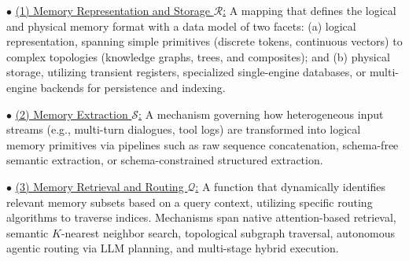 \documentclass{llmxive}
\providecommand{\llm}{\textsc{LLM}\xspace}
\providecommand{\zw}[1]{#1}
\begin{document}

\noindent $\bullet$ \underline{(1) Memory Representation and Storage $\mathcal{R}$:} A mapping that defines the logical and physical memory format with a data model of two facets: (a) logical representation, spanning simple primitives (discrete tokens, continuous vectors) to complex topologies (knowledge graphs, trees, and composites); and (b) physical storage, utilizing transient registers, specialized single-engine databases, or multi-engine backends for persistence and indexing.

\noindent $\bullet$ \underline{(2) Memory Extraction $\mathcal{S}$:} A mechanism governing how heterogeneous input streams (e.g., multi-turn dialogues, tool logs) are transformed into logical memory primitives via pipelines such as raw sequence concatenation, schema-free semantic extraction, or schema-constrained structured extraction.

\noindent $\bullet$ \underline{(3) Memory Retrieval and Routing $\mathcal{Q}$:} A function that dynamically identifies relevant memory subsets based on a query context, utilizing specific routing algorithms to traverse indices. Mechanisms span native attention-based retrieval, semantic $K$-nearest neighbor search, topological subgraph traversal, autonomous agentic routing via \llm planning, and multi-stage hybrid execution.
\end{document}
